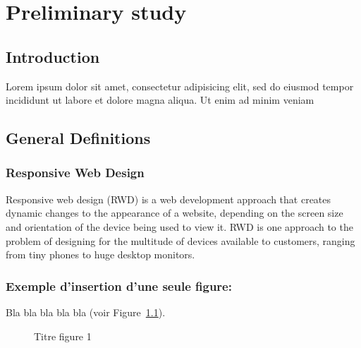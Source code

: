 \chapter{Preliminary study}

\section{Introduction}
Lorem ipsum dolor sit amet, consectetur adipisicing elit, sed do eiusmod
tempor incididunt ut labore et dolore magna aliqua. Ut enim ad minim veniam


\section{General Definitions}
\subsection{Responsive Web Design}
Responsive web design (RWD) is a web development approach that creates dynamic 
changes to the appearance of a website, depending on the screen size and orientation of 
the device being used to view it. RWD is one approach to the problem of designing for 
the multitude of devices available to customers, ranging from tiny phones to huge desktop monitors.

\subsection{Exemple d'insertion d'une seule figure:}

Bla bla bla bla bla (voir Figure~\ref{fig:Allmagne}).

 \begin{figure} [h!]%
 	\vspace*{13pt}
 	\vspace*{13pt}               
 	\caption{Titre figure 1} 
 	\label{fig:Allmagne}
 \end{figure} 


